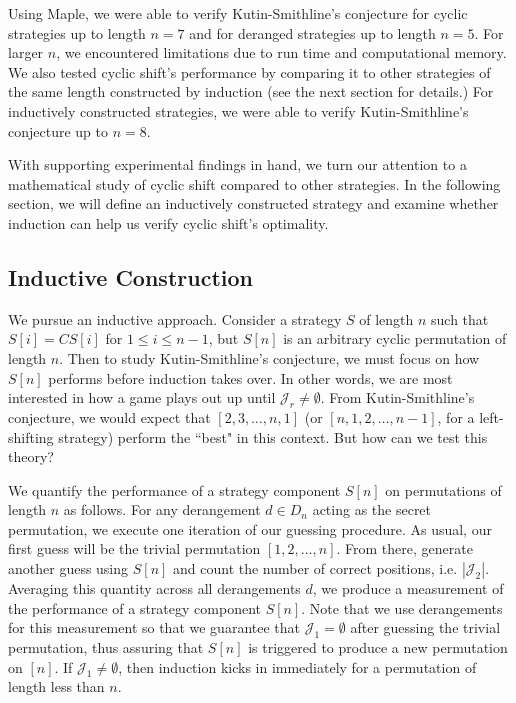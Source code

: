 \documentclass[article]{amsart}
\theoremstyle{definition}
\theoremstyle{definition}
\theoremstyle{remark}
\begin{document}
Using Maple, we were able to verify Kutin-Smithline's conjecture for cyclic strategies up to length $n=7$ and for deranged strategies up to length $n=5$. For larger $n$, we encountered limitations due to run time and computational memory. We also tested cyclic shift's performance by comparing it to other strategies of the same length constructed by induction (see the next section for details.) For inductively constructed strategies, we were able to verify Kutin-Smithline's conjecture up to $n=8$. 

With supporting experimental findings in hand, we turn our attention to a mathematical study of cyclic shift compared to other strategies. In the following section, we will define an inductively constructed strategy and examine whether induction can help us verify cyclic shift's optimality.


\subsection{Inductive Construction} \label{sub: inductive}

We pursue an inductive approach. Consider a strategy $S$ of length $n$ such that $S[i] = CS[i]$ for $1 \leq i \leq n-1$, but $S[n]$ is an arbitrary cyclic permutation of length $n$. Then to study Kutin-Smithline's conjecture, we must focus on how $S[n]$ performs before induction takes over. In other words, we are most interested in how a game plays out up until $\mathcal{J}_r \neq \emptyset$. From Kutin-Smithline's conjecture, we would expect that $[2,3,\dots,n,1]$ (or $[n,1,2,\dots,n-1]$, for a left-shifting strategy) perform the ``best" in this context. But how can we test this theory?

We quantify the performance of a strategy component $S[n]$ on permutations of length $n$ as follows. For any derangement $d \in D_n$ acting as the secret permutation, we execute one iteration of our guessing procedure. As usual, our first guess will be the trivial permutation $[1,2,\dots,n]$. From there, generate another guess using $S[n]$ and count the number of correct positions, i.e. $|\mathcal{J}_2|$. Averaging this quantity across all derangements $d$, we produce a measurement of the performance of a strategy component $S[n]$. Note that we use derangements for this measurement so that we guarantee that $\mathcal{J}_1 = \emptyset$ after guessing the trivial permutation, thus assuring that $S[n]$ is triggered to produce a new permutation on $[n]$. If $\mathcal{J}_1 \neq \emptyset$, then induction kicks in immediately for a permutation of length less than $n$. 
\end{document}
